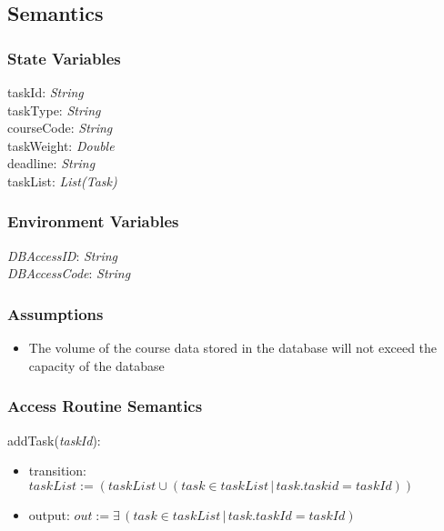 \documentclass[12pt, titlepage]{article}
\begin{document}
\subsection{Semantics}

\subsubsection{State Variables}

taskId: \textit{String}\\
taskType: \textit{String}\\
courseCode: \textit{String}\\
taskWeight: \textit{Double}\\
deadline: \textit{String}\\
taskList: \textit{List(Task)}\\



\subsubsection{Environment Variables}

\textit{DBAccessID}: \textit{String}\\
\textit{DBAccessCode}: \textit{String}

\subsubsection{Assumptions}

\begin{itemize}
  \item The volume of the course data stored in the database will not exceed the capacity of the database
\end{itemize}

\subsubsection{Access Routine Semantics}

\noindent addTask(\textit{taskId}):
\begin{itemize}
\item transition: \(taskList := (taskList \cup (task \in taskList \, | \, task.taskid = taskId))\)
\item output: $out := \mathit{\exists \, (task \in taskList \, | \, task.taskId = taskId)
}$

\end{itemize}
\end{document}

